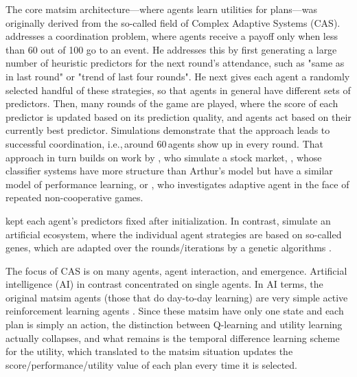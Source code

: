 







The core \gls{matsim} architecture---where agents learn utilities for plans---was originally derived from the so-called field of Complex Adaptive Systems (CAS).  
%
\cite{ArthurBar} addresses a coordination problem, where agents receive a payoff only when less than 60 out of 100 go to an event.  He addresses this by first generating a large number of heuristic predictors for the next round's attendance, such as "same as in last round" or "trend of last four rounds".  He next gives each agent a randomly selected handful of these strategies, so that agents in general have different sets of predictors.  Then, many rounds of the game are played, where the score of each predictor is updated based on its prediction quality, and agents act based on their currently best predictor.  Simulations demonstrate that the approach leads to successful coordination, i.e.,\,around 60\,agents show up in every round.
%
That approach in turn builds on work by \cite{PalmerEtAl_PhysicaD_1994}, who simulate a stock market,  \citet{Holland_1992}, whose classifier systems have more structure than Arthur's model but have a similar model of performance learning, or \cite{AxelrodBook}, who investigates adaptive agent in the face of repeated non-cooperative games.  

\citet{ArthurBar} kept each agent's predictors fixed after initialization.  In contrast,
\citet{HraberJonesForrestEcho} simulate an artificial ecosystem, where the individual agent strategies are based on so-called genes, which are adapted over the rounds/iterations by a genetic algorithms \citep{Goldberg_1989}.

The focus of CAS is on many agents, agent interaction, and emergence. Artificial intelligence (AI) in contrast concentrated on single agents. In AI terms, the original \gls{matsim} agents (those that do day-to-day learning) are very simple active reinforcement learning agents \citep[][Chapter 21.3]{RusselNorvig2010ArtificialIntelligence}. Since these \gls{matsim} have only one state and each plan is simply an action, the distinction between Q-learning and utility learning actually collapses, and what remains is the temporal difference learning scheme for the utility, which translated to the \gls{matsim} situation updates the score/performance/utility value of each plan every time it is selected.

